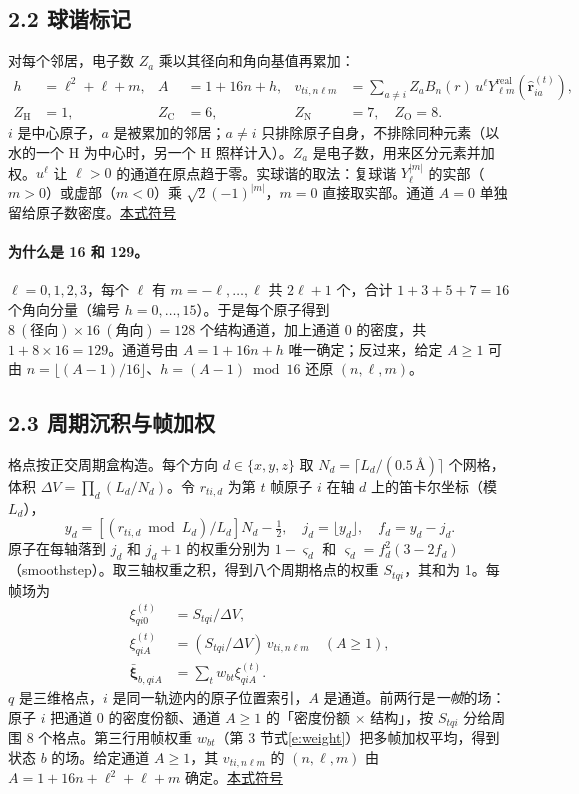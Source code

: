 \documentclass[UTF8,fontset=none,10pt,a4paper]{ctexart}
\newcommand{\X}{\bar{\bm\xi}}
\newcommand{\Ang}{\text{\AA}}
\newcommand{\sd}[1]{\hfill\mbox{\footnotesize\hyperlink{sym:#1}{本式符号}}\par}
\begin{document}
\subsection*{2.2 球谐标记}
对每个邻居，电子数 $Z_a$ 乘以其径向和角向基值再累加：
\begin{equation}\label{e:mark}
 \begin{aligned}
 h&=\ell^2+\ell+m,& A&=1+16n+h,&
 v_{ti,n\ell m}
 &=\sum_{a\ne i}Z_a B_n(r)\,u^\ell
     Y_{\ell m}^{\mathrm{real}}(\widehat{\bm r}_{ia}^{(t)}),\\
 Z_{\mathrm H}&=1,& Z_{\mathrm C}&=6,&Z_{\mathrm N}&=7,\quad Z_{\mathrm O}=8 .
 \end{aligned}
\end{equation}
$i$ 是中心原子，$a$ 是被累加的邻居；$a\ne i$ 只排除原子自身，不排除同种元素（以水的一个 H 为中心时，另一个 H 照样计入）。$Z_a$ 是电子数，用来区分元素并加权。$u^\ell$ 让 $\ell>0$ 的通道在原点趋于零。实球谐的取法：复球谐 $Y_\ell^{|m|}$ 的实部（$m>0$）或虚部（$m<0$）乘 $\sqrt{2}(-1)^{|m|}$，$m=0$ 直接取实部。通道 $A=0$ 单独留给原子数密度。\sd{e:mark}

\paragraph{为什么是 16 和 129。} $\ell=0,1,2,3$，每个 $\ell$ 有 $m=-\ell,\ldots,\ell$ 共 $2\ell+1$ 个，合计 $1+3+5+7=16$ 个角向分量（编号 $h=0,\ldots,15$）。于是每个原子得到 $8\ (\text{径向})\times 16\ (\text{角向})=128$ 个结构通道，加上通道 $0$ 的密度，共 $1+8\times16=129$。通道号由 $A=1+16n+h$ 唯一确定；反过来，给定 $A\ge1$ 可由 $n=\lfloor (A-1)/16\rfloor$、$h=(A-1)\bmod16$ 还原 $(n,\ell,m)$。

\subsection*{2.3 周期沉积与帧加权}
格点按正交周期盒构造。每个方向 $d\in\{x,y,z\}$ 取 $N_d=\lceil L_d/(0.5\,\Ang)\rceil$ 个网格，体积 $\Delta V=\prod_d(L_d/N_d)$。令 $r_{ti,d}$ 为第 $t$ 帧原子 $i$ 在轴 $d$ 上的笛卡尔坐标（模 $L_d$），
\[
 y_d=[(r_{ti,d}\bmod L_d)/L_d]N_d-\tfrac12,\quad
 j_d=\lfloor y_d\rfloor,\quad f_d=y_d-j_d .
\]
原子在每轴落到 $j_d$ 和 $j_d+1$ 的权重分别为 $1-\varsigma_d$ 和 $\varsigma_d=f_d^2(3-2f_d)$（smoothstep）。取三轴权重之积，得到八个周期格点的权重 $S_{tqi}$，其和为 1。每帧场为
\begin{equation}\label{e:frame}
 \begin{aligned}
 \xi^{(t)}_{qi0}&=S_{tqi}/\Delta V,\\
 \xi^{(t)}_{qiA}&=(S_{tqi}/\Delta V)\,v_{ti,n\ell m} \quad(A\geq 1),\\
 \X_{b,qiA}&=\sum_t w_{bt}\xi^{(t)}_{qiA}.
 \end{aligned}
\end{equation}
$q$ 是三维格点，$i$ 是同一轨迹内的原子位置索引，$A$ 是通道。前两行是\emph{一帧}的场：原子 $i$ 把通道 $0$ 的密度份额、通道 $A\ge1$ 的「密度份额 $\times$ 结构」，按 $S_{tqi}$ 分给周围 8 个格点。第三行用帧权重 $w_{bt}$（第 3 节式\eqref{e:weight}）把多帧加权平均，得到状态 $b$ 的场。给定通道 $A\ge1$，其 $v_{ti,n\ell m}$ 的 $(n,\ell,m)$ 由 $A=1+16n+\ell^2+\ell+m$ 确定。\sd{e:frame}
\end{document}
